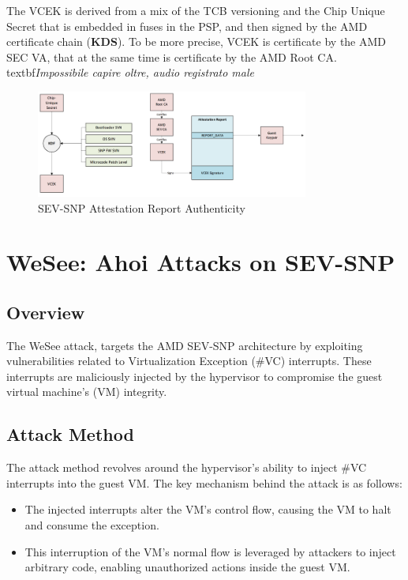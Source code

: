 The VCEK is derived from a mix of the TCB versioning and the Chip Unique Secret that is embedded in fuses in the PSP, and then signed by the AMD certificate chain (\textbf{KDS}). 
To be more precise, VCEK is certificate by the AMD SEC VA, that at the same time is certificate by the AMD Root CA. \\
textbf{\textit{Impossibile capire oltre, audio registrato male}} 
\begin{figure}[h]
    \centering
    \includegraphics[width=0.8\textwidth]{img/snp-attestation-authenticity.png}
    \caption{SEV-SNP Attestation Report Authenticity}
    \label{fig:snp_attestation_authenticity}
\end{figure}

\section{WeSee: Ahoi Attacks on SEV-SNP}

\subsection{Overview}
The WeSee attack, targets the AMD SEV-SNP architecture by exploiting vulnerabilities related to Virtualization Exception (\#VC) interrupts. These interrupts are maliciously injected by the hypervisor to compromise the guest virtual machine's (VM) integrity.

\subsection{Attack Method}
The attack method revolves around the hypervisor's ability to inject \#VC interrupts into the guest VM. The key mechanism behind the attack is as follows:
\begin{itemize}
    \item The injected interrupts alter the VM's control flow, causing the VM to halt and consume the exception.
    \item This interruption of the VM's normal flow is leveraged by attackers to inject arbitrary code, enabling unauthorized actions inside the guest VM.
\end{itemize}

